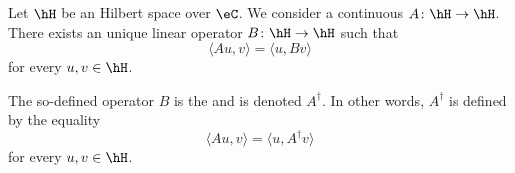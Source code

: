 \begin{propositionDef}       \label{DEFooAAKCooZJCHPS}
	Let \( \hH\) be an Hilbert space over \( \eC\). We consider a continuous \( A\colon \hH\to \hH\). There exists an unique linear operator \( B\colon \hH\to \hH\) such that
	\begin{equation}
		\langle Au, v\rangle =\langle u, Bv\rangle
	\end{equation}
	for every \( u,v\in \hH\).

	The so-defined operator \( B\) is the  and is denoted \( A^{\dag}\). In other words, \( A^{\dag}\) is defined by the equality
	\begin{equation}        \label{EQooPTUWooPCbNxA}
		\langle Au, v\rangle =\langle u, A^{\dag}v\rangle
	\end{equation}
	for every \( u,v\in\hH\).
\end{propositionDef}

